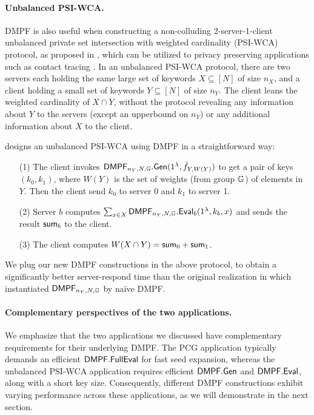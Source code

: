 \paragraph{Unbalanced PSI-WCA.}
DMPF is also useful when constructing a non-colluding 2-server-1-client unbalanced private set intersection with weighted cardinality (PSI-WCA) protocol, as proposed in \cite{cryptoeprint:2020/1599}, which can be utilized to privacy preserving applications such as contact tracing \cite{eames2003contact}. In an unbalanced PSI-WCA protocol, there are two servers each holding the same large set of keywords $X\subseteq [N]$ of size $n_X$, and a client holding a small set of keywords $Y\subseteq[N]$ of size $n_Y$. The client leans the weighted cardinality of $X\cap Y$, without the protocol revealing any information about $Y$ to the servers (except an upperbound on $n_Y$) or any additional information about $X$ to the client. 

\cite{cryptoeprint:2020/1599} designs an unbalanced PSI-WCA using DMPF in a straightforward way:
\begin{itemize}
  \item[(1)] The client invokes ${\sf DMPF}_{n_Y,N,\mathbb{G}}.{\sf Gen}(1^\lambda, \hat{f}_{Y,W(Y)})$ to get a pair of keys $ (k_0,k_1)$, where $W(Y)$ is the set of weights (from group $\mathbb{G}$) of elements in $Y$. Then the client send $k_0$ to server 0 and $k_1$ to server 1. 
  \item[(2)] Server $b$ computes $\sum_{x\in X}{\sf DMPF}_{n_Y,N,\mathbb{G}}.{\sf Eval}_b(1^\lambda, k_b,x)$ and sends the result ${\sf sum}_b$ to the client. 
  \item[(3)] The client computes $W(X\cap Y)={\sf sum}_0+{\sf sum}_1$. 
\end{itemize}
We plug our new DMPF constructions in the above protocol, to obtain a significantly better server-respond time than the original realization in \cite{cryptoeprint:2020/1599} which instantiated ${\sf DMPF}_{n_Y,N,\mathbb{G}}$ by na\"ive DMPF. 

\paragraph{Complementary perspectives of the two applications.}
We emphasize that the two applications we discussed have complementary requirements for their underlying DMPF. The PCG application typically demands an efficient ${\sf DMPF}.{\sf FullEval}$ for fast seed expansion, whereas the unbalanced PSI-WCA application requires efficient ${\sf DMPF}.{\sf Gen}$ and ${\sf DMPF}.{\sf Eval}$, along with a short key size. Consequently, different DMPF constructions exhibit varying performance across these applications, as we will demonstrate in the next section.


